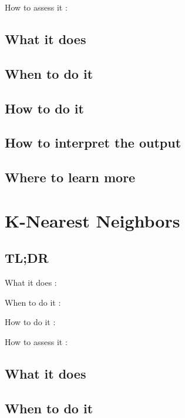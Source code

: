 \documentclass[
]{book}
\begin{document}
How to assess it
:

\hypertarget{what-it-does-6}{%
\section{What it does}\label{what-it-does-6}}

\hypertarget{when-to-do-it-6}{%
\section{When to do it}\label{when-to-do-it-6}}

\hypertarget{how-to-do-it-6}{%
\section{How to do it}\label{how-to-do-it-6}}

\hypertarget{how-to-interpret-the-output-6}{%
\section{How to interpret the output}\label{how-to-interpret-the-output-6}}

\hypertarget{where-to-learn-more-6}{%
\section{Where to learn more}\label{where-to-learn-more-6}}

\hypertarget{k-nearest-neighbors}{%
\chapter{K-Nearest Neighbors}\label{k-nearest-neighbors}}

\hypertarget{tldr-7}{%
\section{TL;DR}\label{tldr-7}}

What it does
:

When to do it
:

How to do it
:

How to assess it
:

\hypertarget{what-it-does-7}{%
\section{What it does}\label{what-it-does-7}}

\hypertarget{when-to-do-it-7}{%
\section{When to do it}\label{when-to-do-it-7}}
\end{document}
